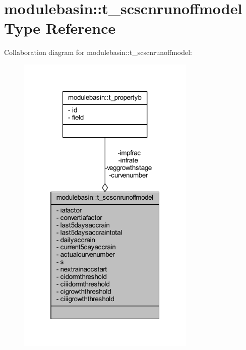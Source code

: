 \hypertarget{structmodulebasin_1_1t__scscnrunoffmodel}{}\section{modulebasin\+:\+:t\+\_\+scscnrunoffmodel Type Reference}
\label{structmodulebasin_1_1t__scscnrunoffmodel}


Collaboration diagram for modulebasin\+:\+:t\+\_\+scscnrunoffmodel\+:\nopagebreak
\begin{figure}[H]
\begin{center}
\leavevmode
\includegraphics[width=241pt]{structmodulebasin_1_1t__scscnrunoffmodel__coll__graph}
\end{center}
\end{figure}

